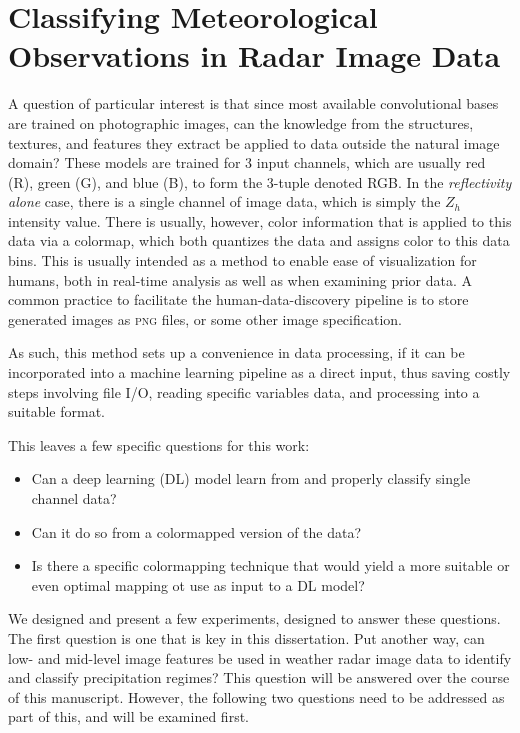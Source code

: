 \chapter{Classifying Meteorological Observations in Radar Image Data}
\label{sec:classifying}


A question of particular interest is that since most available convolutional bases are trained on photographic images, can the knowledge from the structures, textures, and features they extract be applied to data outside the natural image domain?
These models are trained for 3 input channels, which are usually red (R), green (G), and blue (B), to form the 3-tuple denoted RGB.
In the \textit{reflectivity alone} case, there is a single channel of image data, which is simply the $Z_h$ intensity value.
There is usually, however, color information that is applied to this data via a colormap, which both quantizes the data and assigns color to this data bins. 
This is usually intended as a method to enable ease of visualization for humans, both in real-time analysis as well as when examining prior data.
A common practice to facilitate the human-data-discovery pipeline is to store generated images as \textsc{png} files, or some other image specification.

As such, this method sets up a convenience in data processing, if it can be incorporated into a machine learning pipeline as a direct input, thus saving costly steps involving file I/O, reading specific variables data, and processing into a suitable format. 

This leaves a few specific questions for this work:

\begin{itemize}
	\item Can a deep learning (DL) model learn from and properly classify single channel data?
	\item Can it do so from a colormapped version of the data?
	\item Is there a specific colormapping technique that would yield a more suitable or even optimal mapping ot use as input to a DL model?
\end{itemize}

We designed and present a few experiments, designed to answer these questions.
The first question is one that is key in this dissertation.
Put another way, can low- and mid-level image features be used in weather radar image data to identify and classify precipitation regimes?
This question will be answered over the course of this manuscript.
However, the following two questions need to be addressed as part of this, and will be examined first.

